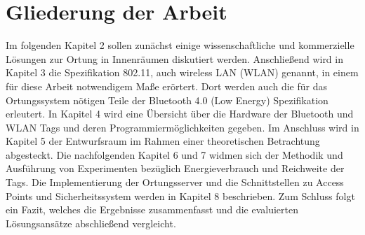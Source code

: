 \section{Gliederung der Arbeit}
\label{ch:Einleitung:sec:Gliederung}
Im folgenden Kapitel 2 sollen zunächst einige wissenschaftliche und kommerzielle Lösungen zur Ortung in Innenräumen diskutiert werden. 
Anschließend wird in Kapitel 3 die Spezifikation 802.11, auch wireless LAN (WLAN) genannt, in einem für diese Arbeit notwendigem Maße erörtert. Dort werden auch die für das Ortungssystem nötigen Teile der Bluetooth 4.0 (Low Energy) Spezifikation erleutert. 
In Kapitel 4 wird eine Übersicht über die Hardware der Bluetooth und WLAN Tags und deren Programmiermöglichkeiten gegeben. 
Im Anschluss wird in Kapitel 5 der Entwurfsraum im Rahmen einer theoretischen Betrachtung abgesteckt. 
Die nachfolgenden Kapitel 6 und 7 widmen sich der Methodik und Ausführung von Experimenten bezüglich Energieverbrauch und Reichweite der Tags.
Die Implementierung der Ortungsserver und die Schnittstellen zu Access Points und Sicherheitssystem werden in Kapitel 8 beschrieben.
Zum Schluss folgt ein Fazit, welches die Ergebnisse zusammenfasst und die evaluierten Lösungsansätze abschließend vergleicht.

